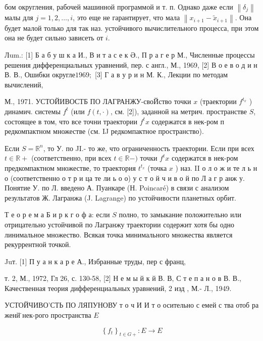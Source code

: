 \documentclass[10pt]{article}
\begin{document}
бом округления, рабочей машинной программой и т. п. Однако даже если $\left\|\delta_{j}\right\|$ малы для $j=1,2, \ldots, i$, это еще не гарантирует, что мала $\left\|x_{i+1}-\tilde{x}_{i+1}\right\|$. Она будет малой только для так наз. устойчивого вычислительного процесса, при этом она не будет сильно зависеть от $i$.



Лum.: [1] Б а б у ш к а И., В и т а с е к Ә., П р а г е р М., Численные процессы решения дифференциальных уравнений, пер. с англ., М., 1969, [2] В о е в о д и н В. В., Ошибки округле$1969 ;$ [3] Г а в у р и н М. К., Лекции по методам вычислений,

М., 1971. УСТОЙИВОСТБ ПО ЛАГРАНЖУ-своЙство точки $x$ (траектории $f^{t_{x}}$ ) динамич. системы $f^{t}$ (или $f(t, \cdot)$, см. [2]), заданной на метрич. пространстве $S$, состоящее в том, что все точни траектории $f^{t} x$ содержатся в нек-ром п редкомпактном множестве (см. IJ редкомпактное пространство).



Если $S=\mathbb{R}^{n}$, то У. по JI.- то же, что ограниченность траектории. Если при всех $t \in \mathbb{R}+$ (соответственно, при всех $t \in \mathbb{R}-)$ точки $f^{t} x$ содержатся в нек-ром предкомпактном множестве, то траектория $t^{t_{x}}$ (точка $x$ ) наз. II о л о ж и те л ь н о (соответственно о т р и ца те ли ь о о) у с т о й ч и в о й по Л а г р анж у. Понятие У. по Л. введено А. Пуанкаре (Н. Poincaré) в связи с анализом результатов Ж. Лагранжа (J. Lagrange) по устойчивости планетных орбит.



Т е о р е м а Б и р к г о ф а: если $S$ полно, то замыкание положительно или отрицательно устойчивой по Лагранжу траектории содержит хотя бы одно линимальное множество. Всякая точка минимального множества является рекуррентной точкой.



Juт. [1] П у а н к а р е А., Избранные труды, пер с франц,

т. 2, М., 1972, Гл 26, с. 130-58, [2] Н е м ы й к й В. В, С т е п а н о в В. В., Качественная теория дифференциальных уравнений, 2 изд , М.- Л., 1949.



УСТОЙЧИВО'СТЬ ПО ЛЯПУНОВУ т о ч И И т о осительно с емей с тва отоб ра женй̈ нек-рого пространства $E$



\[

\left\{f_{t}\right\}_{t \in G+}: E \longrightarrow E

\]
\end{document}
